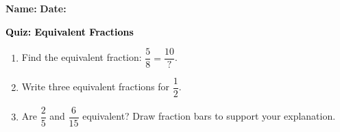 \documentclass[12pt, letterpaper, fleqn]{article}
\begin{document}
\textbf{Name:} \underline{\hspace{5cm}}
\hfill
\textbf{Date:} \underline{\hspace{3cm}}\\

\begin{tcolorbox}[colback=customteal!20]
    \large\textcolor{black}{\textbf{Quiz: Equivalent Fractions}}
\end{tcolorbox}
\begin{enumerate}[itemsep=3.5cm, leftmargin=0.6cm]
\item Find the equivalent fraction: $\dfrac{5}{8} = \dfrac{10}{\text{?}}$.
\vspace{3.5cm}
\item Write three equivalent fractions for $\dfrac{1}{2}$.
\vspace{3.5cm}
\item Are $\dfrac{2}{5}$ and $\dfrac{6}{15}$ equivalent? Draw fraction bars to support your explanation.
\end{enumerate}
\end{document}
